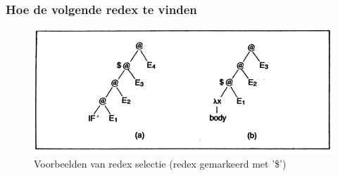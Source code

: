 \documentclass{beamer}
\begin{document}
\begin{frame}
  \frametitle{Hoe de volgende redex te vinden}
  \begin{figure}
    \includegraphics[width=\linewidth]{images/slpj202}
    \caption{Voorbeelden van redex selectie (redex gemarkeerd met '\$')}
  \end{figure}
\end{frame}
\end{document}
